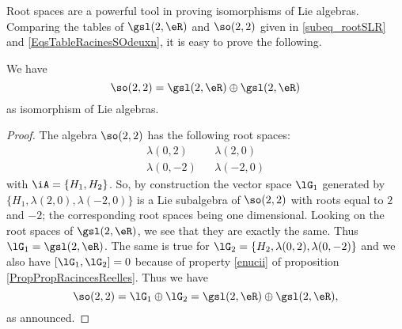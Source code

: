 Root spaces are a powerful tool in proving isomorphisms of Lie algebras. Comparing the tables of $\gsl(2,\eR)$ and $\so(2,2)$ given in \ref{subeq_rootSLR} and \ref{EqsTableRacinesSOdeuxn}, it is easy to prove the following.

\begin{proposition}
We have
\begin{equation}
	\so(2,2)=\gsl(2,\eR)\oplus\gsl(2,\eR)
\end{equation}
as isomorphism of Lie algebras.
\end{proposition}

\begin{proof}
The algebra $\so(2,2)$ has the following root spaces:
\begin{align*}
\lambda(0,2)&&\lambda(2,0)\\
\lambda(0,-2)&&\lambda(-2,0)
\end{align*}
with $\iA=\{ H_1,H_2 \}$. So, by construction the vector space $\lG_1$ generated by $\{ H_1,\lambda(2,0),\lambda(-2,0) \}$ is a Lie subalgebra of $\so(2,2)$ with roots equal to $2$ and $-2$; the corresponding root spaces being one dimensional. Looking on the root spaces of $\gsl(2,\eR)$, we see that they are exactly the same. Thus $\lG_1=\gsl(2,\eR)$. The same is true for $\lG_2=\{ H_2,\lambda(0,2),\lambda(0,-2)  \}$ and we also have $[\lG_1,\lG_2]=0$ because of property \ref{enucii} of proposition \ref{PropPropRacincesReelles}. Thus we have
\[ 
	\so(2,2)=\lG_1\oplus\lG_2=\gsl(2,\eR)\oplus\gsl(2,\eR),
\]
as announced.
\end{proof}

